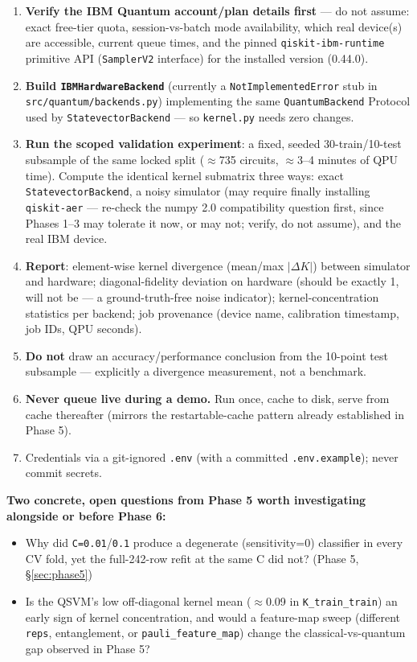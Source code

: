 \documentclass[11pt,a4paper]{article}
\newcommand{\code}[1]{\texttt{\small #1}}
\begin{document}
\begin{enumerate}[leftmargin=1.4em]
  \item \textbf{Verify the IBM Quantum account/plan details first} --- do not assume: exact free-tier quota, session-vs-batch mode availability, which real device(s) are accessible, current queue times, and the pinned \code{qiskit-ibm-runtime} primitive API (\code{SamplerV2} interface) for the installed version (0.44.0).
  \item \textbf{Build \code{IBMHardwareBackend}} (currently a \code{NotImplementedError} stub in \code{src/quantum/backends.py}) implementing the same \code{QuantumBackend} Protocol used by \code{StatevectorBackend} --- so \code{kernel.py} needs zero changes.
  \item \textbf{Run the scoped validation experiment}: a fixed, seeded 30-train/10-test subsample of the same locked split ($\approx$735 circuits, $\approx$3--4 minutes of QPU time). Compute the identical kernel submatrix three ways: exact \code{StatevectorBackend}, a noisy simulator (may require finally installing \code{qiskit-aer} --- re-check the numpy 2.0 compatibility question first, since Phases 1--3 may tolerate it now, or may not; verify, do not assume), and the real IBM device.
  \item \textbf{Report}: element-wise kernel divergence (mean/max $|\Delta K|$) between simulator and hardware; diagonal-fidelity deviation on hardware (should be exactly 1, will not be --- a ground-truth-free noise indicator); kernel-concentration statistics per backend; job provenance (device name, calibration timestamp, job IDs, QPU seconds).
  \item \textbf{Do not} draw an accuracy/performance conclusion from the 10-point test subsample --- explicitly a divergence measurement, not a benchmark.
  \item \textbf{Never queue live during a demo.} Run once, cache to disk, serve from cache thereafter (mirrors the restartable-cache pattern already established in Phase 5).
  \item Credentials via a git-ignored \code{.env} (with a committed \code{.env.example}); never commit secrets.
\end{enumerate}

\textbf{Two concrete, open questions from Phase 5 worth investigating alongside or before Phase 6:}
\begin{itemize}[leftmargin=1.4em]
  \item Why did \code{C=0.01}/\code{0.1} produce a degenerate (sensitivity=0) classifier in every CV fold, yet the full-242-row refit at the same C did not? (Phase 5, \S\ref{sec:phase5})
  \item Is the QSVM's low off-diagonal kernel mean ($\approx$0.09 in \code{K\_train\_train}) an early sign of kernel concentration, and would a feature-map sweep (different \code{reps}, entanglement, or \code{pauli\_feature\_map}) change the classical-vs-quantum gap observed in Phase 5?
\end{itemize}
\end{document}
